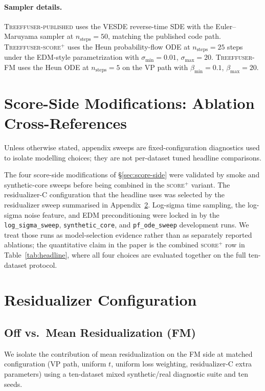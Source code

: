 \documentclass{tpm2026}
\begin{document}
\paragraph{Sampler details.}
\textsc{Treeffuser-published} uses the VESDE reverse-time SDE with the Euler--Maruyama sampler at $n_{\text{steps}}=50$, matching the published code path. \textsc{Treeffuser-score$^+$} uses the Heun probability-flow ODE at $n_{\text{steps}}=25$ steps under the EDM-style parametrization with $\sigma_{\min}=0.01$, $\sigma_{\max}=20$. \textsc{Treeffuser-FM} uses the Heun ODE at $n_{\text{steps}}=5$ on the VP path with $\beta_{\min}=0.1$, $\beta_{\max}=20$.

\section{Score-Side Modifications: Ablation Cross-References}\label{app:score-side}

Unless otherwise stated, appendix sweeps are fixed-configuration diagnostics used to isolate modelling choices; they are not per-dataset tuned headline comparisons.

The four score-side modifications of \S\ref{sec:score-side} were validated by smoke and synthetic-core sweeps before being combined in the \textsc{score$^+$} variant.
The residualizer-C configuration that the headline uses was selected by the residualizer sweep summarised in Appendix~\ref{app:resid-config}. Log-sigma time sampling, the log-sigma noise feature, and EDM preconditioning were locked in by the \texttt{log\_sigma\_sweep}, \texttt{synthetic\_core}, and \texttt{pf\_ode\_sweep} development runs. We treat those runs as model-selection evidence rather than as separately reported ablations; the quantitative claim in the paper is the combined \textsc{score$^+$} row in Table~\ref{tab:headline}, where all four choices are evaluated together on the full ten-dataset protocol.

\section{Residualizer Configuration}\label{app:resid-config}

\subsection{Off vs.\ Mean Residualization (FM)}\label{app:off-vs-mean}

We isolate the contribution of mean residualization on the FM side at matched configuration (VP path, uniform $t$, uniform loss weighting, residualizer-C extra parameters) using a ten-dataset mixed synthetic/real diagnostic suite and ten seeds.
\end{document}
